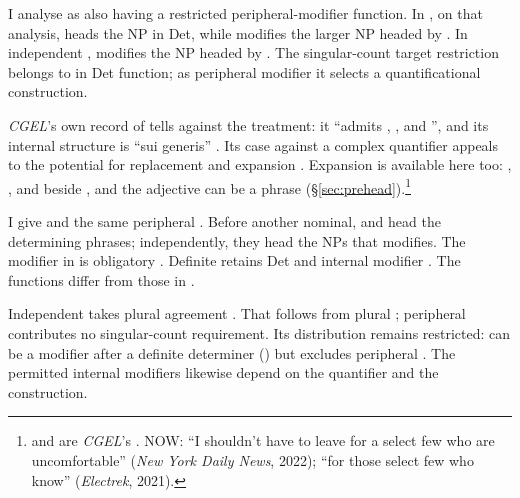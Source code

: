 \documentclass[12pt]{article}
\begin{document}
I analyse  as also having a restricted peripheral-modifier function. In , on that analysis,  heads the NP in Det, while  modifies the larger NP headed by . In independent ,  modifies the NP headed by . The singular-count target restriction belongs to  in Det function; as peripheral modifier it selects a quantificational construction.

\textit{CGEL}'s own record of  tells against the treatment: it \enquote{admits , , and }, and its internal structure is \enquote{sui generis} \citep[392, 394]{huddleston2002}. Its case against a complex quantifier  appeals to the potential for replacement and expansion \citep[351--352]{huddleston2002}. Expansion is available here too: , , and  beside , and the adjective can be a phrase (§\ref{sec:prehead}).\footnote{ and  are \textit{CGEL}'s \citep[392]{huddleston2002}. NOW: \enquote{I shouldn't have to leave for a select few who are uncomfortable} (\textit{New York Daily News}, 2022); \enquote{for those select few who know} (\textit{Electrek}, 2021).}

I give  and  the same peripheral . Before another nominal,  and  head the determining phrases; independently, they head the NPs that  modifies. The modifier in  is obligatory \citep[394]{huddleston2002}. Definite  retains Det  and internal modifier  \citep[392]{huddleston2002}. The functions differ from those in .

Independent  takes plural agreement \citep[392]{huddleston2002}. That follows from plural ; peripheral  contributes no singular-count requirement. Its distribution remains restricted:  can be a modifier after a definite determiner () \citep[392]{huddleston2002} but excludes peripheral . The permitted internal modifiers likewise depend on the quantifier and the construction.
\end{document}
